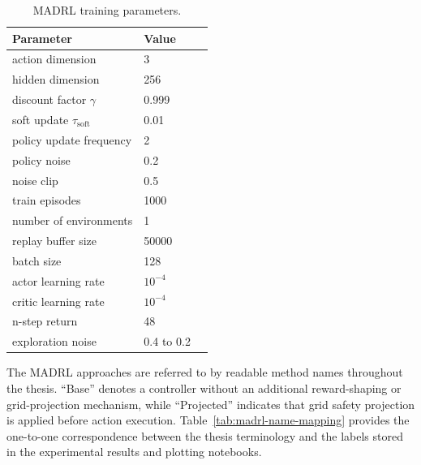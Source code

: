 \begin{table}[htpb]
  \centering
  \caption{MADRL training parameters.}\label{tab:madrl-training-params}
  \begin{tabular}{lll}
    \toprule
    Parameter & Value \\
    \midrule
    action dimension & 3 \\
    hidden dimension & 256 \\
    discount factor \(\gamma\) & 0.999 \\
    soft update \(\tau_{\mathrm{soft}}\) & 0.01 \\
    policy update frequency & 2 \\
    policy noise & 0.2 \\
    noise clip & 0.5 \\
    train episodes & 1000 \\
    number of environments & 1 \\
    replay buffer size & 50000 \\
    batch size & 128 \\
    actor learning rate & \(10^{-4}\) \\
    critic learning rate & \(10^{-4}\) \\
    n-step return & 48 \\
    exploration noise & 0.4 to 0.2 \\
    \bottomrule
  \end{tabular}
\end{table}

The MADRL approaches are referred to by readable method names throughout the thesis. ``Base'' denotes a controller without an additional reward-shaping or grid-projection mechanism, while ``Projected'' indicates that grid safety projection is applied before action execution. Table~\ref{tab:madrl-name-mapping} provides the one-to-one correspondence between the thesis terminology and the labels stored in the experimental results and plotting notebooks.

